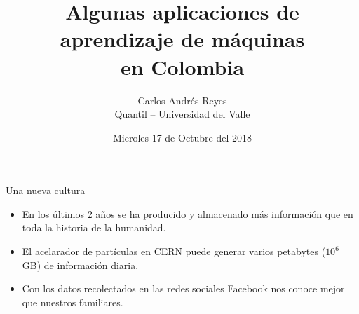 \documentclass[11pt,usenames, dvipsnames]{beamer}
\author[creyesk]{Carlos Andrés Reyes\\
                 Quantil -- Universidad del Valle}
\title{Algunas aplicaciones de aprendizaje de máquinas \\
       en Colombia}
\date{Mieroles 17 de Octubre del 2018}
\begin{document}
{ %
    \begin{frame}[plain]
     \end{frame}
}


\begin{frame}
\titlepage
\end{frame}


\begin{frame}{Una nueva cultura}
    \begin{itemize}
        \item En los últimos 2 años se ha producido y almacenado más información que en toda la historia de la humanidad.

        \item El acelarador de partículas en CERN puede generar varios petabytes ($10^6$ GB) de información diaria.

        \item Con los datos recolectados en las redes sociales Facebook nos conoce mejor que nuestros familiares.
    \end{itemize}
\end{frame}
\end{document}
